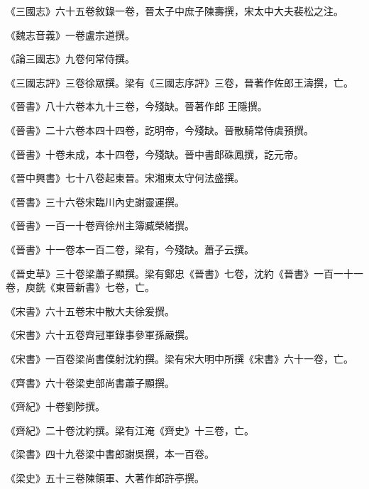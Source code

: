 \begin{pinyinscope}
 《三國志》六十五卷敘錄一卷，晉太子中庶子陳壽撰，宋太中大夫裴松之注。



 《魏志音義》一卷盧宗道撰。



 《論三國志》九卷何常侍撰。



 《三國志評》三卷徐眾撰。梁有《三國志序評》三卷，晉著作佐郎王濤撰，亡。



 《晉書》八十六卷本九十三卷，今殘缺。晉著作郎
 王隱撰。



 《晉書》二十六卷本四十四卷，訖明帝，今殘缺。晉散騎常侍虞預撰。



 《晉書》十卷未成，本十四卷，今殘缺。晉中書郎硃鳳撰，訖元帝。



 《晉中興書》七十八卷起東晉。宋湘東太守何法盛撰。



 《晉書》三十六卷宋臨川內史謝靈運撰。



 《晉書》一百一十卷齊徐州主簿臧榮緒撰。



 《晉書》十一卷本一百二卷，梁有，今殘缺。蕭子云撰。



 《晉史草》三十卷梁蕭子顯撰。梁有鄭忠《晉書》七卷，沈約《晉書》一百一十一卷，庾銑《東晉新書》七卷，亡。



 《宋書》六十五卷宋中散大夫徐爰撰。



 《宋書》六十五卷齊冠軍錄事參軍孫嚴撰。



 《宋書》一百卷梁尚書僕射沈約撰。梁有宋大明中所撰《宋書》六十一卷，亡。



 《齊書》六十卷梁吏部尚書蕭子顯撰。



 《齊紀》十卷劉陟撰。



 《齊紀》二十卷沈約撰。梁有江淹《齊史》十三卷，亡。



 《梁書》四十九卷梁中書郎謝吳撰，本一百卷。



 《梁史》五十三卷陳領軍、大著作郎許亭撰。




\end{pinyinscope}
